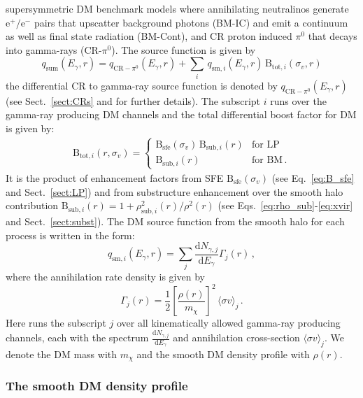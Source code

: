 \documentclass[10pt,aps,pra,reprint,amsmath,amsfonts,amssymb,showpacs,nofootinbib,floatfix]{revtex4-1}
\newcommand{\rmn}{\mathrm}
\newcommand{\sfe}{\rmn{sfe}}
\newcommand{\sub}{\rmn{sub}}
\newcommand{\B}{\rmn{B}}
\newcommand{\qCR}{q_{\rmn{CR}-\ensuremath{\pi^0}}}
\newcommand{\dd}{\rmn{d}}
\newcommand{\mx}{\ensuremath{m_{\chi}}}
\newcommand{\ngammaj}{\ensuremath{N_{\gamma,j}}}
\newcommand{\sigmaannv}{\ensuremath{\langle\sigma v\rangle}}
\newcommand{\sigv}{\ensuremath{\sigma_v}}
\newcommand{\egamma}{\ensuremath{E_{\gamma}}}
\newcommand{\eg}{E_\gamma}
\begin{document}
supersymmetric DM benchmark models where annihilating neutralinos
generate $\rmn{e}^+/\rmn{e}^-$ pairs that upscatter background photons
(BM-IC) and emit a continuum as well as final state radiation
(BM-Cont), and CR proton induced $\pi^0$ that decays into gamma-rays
(CR-$\pi^0$). The source function is given by
\begin{equation}
q_\rmn{sum} (\eg,r) = \qCR(\eg,r)+
\sum_i \,q_{\rmn{sm},i}(\eg,r)\,\B_{\rmn{tot},i}(\sigv,r)
\end{equation}
the differential CR to gamma-ray source function is denoted by
$\qCR(\eg,r)$ (see Sect.~\ref{sect:CRs} and \cite{2010MNRAS.409..449P}
for further details). The subscript $i$ runs over the gamma-ray
producing DM channels and the total differential boost factor for DM
is given by:
\begin{eqnarray}
\B_{\rmn{tot},i}(r,\sigv) = \left\{\begin{array}{cc}
\B_\sfe(\sigv)\,\B_{\sub,i}(r) &\rmn{for\,\,LP}\\
\B_{\sub,i}(r) &\rmn{for\,\,BM\,.}\end{array}\right.
\end{eqnarray}
It is the product of enhancement factors from SFE $\B_\sfe(\sigv)$
(see Eq.~\ref{eq:B_sfe} and Sect.~\ref{sect:LP}) and from substructure
enhancement over the smooth halo contribution $\B_{\sub,i}(r) =
1+\rho_{\sub,i}^2(r)/\rho^2(r)$ (see
Eqs.~\ref{eq:rho_sub}-\ref{eq:xvir} and Sect.~\ref{sect:subst}).  The
DM source function from the smooth halo for each process is written in
the form:
\begin{equation}
\label{eq:q_sm}
q_{\rmn{sm},i} (\egamma,r) = \sum_j
\frac{\dd \ngammaj}{\dd E_\gamma} \Gamma_j(r)\,,
\end{equation}
where the annihilation rate density is given by 
\begin{equation}
\label{eq:ann_rate}
\Gamma_j(r) = \frac{1}{2} \left[\frac{\rho(r)}{\mx}\right]^2 
\, \sigmaannv_j\,.
\end{equation}
Here runs the subscript $j$ over all kinematically allowed gamma-ray
producing channels, each with the spectrum $\frac{\dd
  \ngammaj}{\dd\eg}$ and annihilation cross-section $\sigmaannv_j$.
We denote the DM mass with $\mx$ and the smooth DM density profile
with $\rho(r)$.


\subsubsection{The smooth DM density profile}
\label{sect:smooth}
\end{document}
